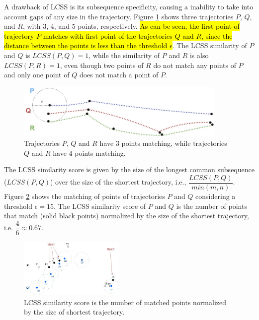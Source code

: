 A drawback of LCSS is its subsequence specificity, causing a inability to take into account gaps of any size in the trajectory. Figure \ref{fig:related_trajes_PQR} shows three trajectories $P$, $Q$, and $R$, with 3, 4, and 5 points, respectively. \hl{As can be seen, the first point of trajectory $P$ matches with first point of the trajectories $Q$ and $R$, since the distance between the points is less than the threshold $\epsilon$}. The LCSS similarity of $P$ and $Q$ is $LCSS(P, Q) = 1$, while the similarity of $P$ and $R$ is also $LCSS(P, R) = 1$, even though two points of $R$ do not match any points of $P$ and only one point of $Q$ does not match a point of $P$.


\begin{figure}[h]
\centering
\includegraphics[width=0.9\textwidth]{Related_Works/related_trajes_PQR.jpg}
\caption{\label{fig:related_trajes_PQR}Trajectories $P$, $Q$ and $R$ have 3 points matching, while trajectories $Q$ and $R$ have 4 points matching.}
\end{figure}

The LCSS similarity score is given by the size of the longest common subsequence ($LCSS(P, Q)$) over the size of the shortest trajectory, i.e., $\dfrac{LCSS(P, Q)}{min(m, n)}$.
Figure \ref{fig:related_trajes_LCSS} shows the matching of points of trajectories $P$ and $Q$ considering a threshold $\epsilon =15$. The LCSS similarity score of $P$ and $Q$ is the number of points that match (solid black points) normalized by the size of the shortest trajectory, i.e. $\dfrac{4}{6} \approx 0.67 $.

\begin{figure}[h]
\centering
\includegraphics[width=0.45\textwidth]{Related_Works/related_trajes-LCSS.jpg}
\caption{\label{fig:related_trajes_LCSS}LCSS similarity score is the number of matched points normalized by the size of shortest trajectory.}
\end{figure}


